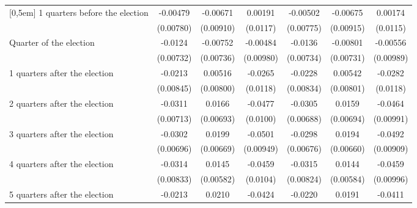 \begin{table}[!ht]
\begin{tabular}{l*{6}{c}}
[0,5em]
 1 quarters before the election&    -0.00479         &    -0.00671         &     0.00191         &    -0.00502         &    -0.00675         &     0.00174         \\
                    &   (0.00780)         &   (0.00910)         &    (0.0117)         &   (0.00775)         &   (0.00915)         &    (0.0115)         \\
[0,5em]
Quarter of the election&     -0.0124         &    -0.00752         &    -0.00484         &     -0.0136         &    -0.00801         &    -0.00556         \\
                    &   (0.00732)         &   (0.00736)         &   (0.00980)         &   (0.00734)         &   (0.00731)         &   (0.00989)         \\
[0,5em]
 1 quarters after the election&     -0.0213\sym{*}  &     0.00516         &     -0.0265\sym{*}  &     -0.0228\sym{**} &     0.00542         &     -0.0282\sym{*}  \\
                    &   (0.00845)         &   (0.00800)         &    (0.0118)         &   (0.00834)         &   (0.00801)         &    (0.0118)         \\
[0,5em]
 2 quarters after the election&     -0.0311\sym{***}&      0.0166\sym{*}  &     -0.0477\sym{***}&     -0.0305\sym{***}&      0.0159\sym{*}  &     -0.0464\sym{***}\\
                    &   (0.00713)         &   (0.00693)         &    (0.0100)         &   (0.00688)         &   (0.00694)         &   (0.00991)         \\
[0,5em]
 3 quarters after the election&     -0.0302\sym{***}&      0.0199\sym{**} &     -0.0501\sym{***}&     -0.0298\sym{***}&      0.0194\sym{**} &     -0.0492\sym{***}\\
                    &   (0.00696)         &   (0.00669)         &   (0.00949)         &   (0.00676)         &   (0.00660)         &   (0.00909)         \\
[0,5em]
 4 quarters after the election&     -0.0314\sym{***}&      0.0145\sym{*}  &     -0.0459\sym{***}&     -0.0315\sym{***}&      0.0144\sym{*}  &     -0.0459\sym{***}\\
                    &   (0.00833)         &   (0.00582)         &    (0.0104)         &   (0.00824)         &   (0.00584)         &   (0.00996)         \\
[0,5em]
 5 quarters after the election&     -0.0213\sym{**} &      0.0210\sym{*}  &     -0.0424\sym{**} &     -0.0220\sym{**} &      0.0191\sym{*}  &     -0.0411\sym{**} \\

\end{tabular}
\end{table}
